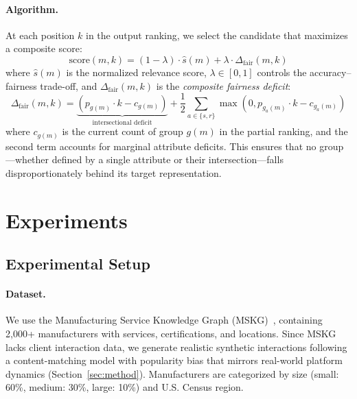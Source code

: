 \documentclass[sigconf,natbib=true]{acmart}
\begin{document}
\paragraph{Algorithm.} At each position $k$ in the output ranking, we select the candidate that maximizes a composite score:
\begin{equation}
    \text{score}(m, k) = (1 - \lambda) \cdot \hat{s}(m) + \lambda \cdot \Delta_{\text{fair}}(m, k)
    \label{eq:composite}
\end{equation}
where $\hat{s}(m)$ is the normalized relevance score, $\lambda \in [0, 1]$ controls the accuracy--fairness trade-off, and $\Delta_{\text{fair}}(m, k)$ is the \emph{composite fairness deficit}:
\begin{equation}
    \Delta_{\text{fair}}(m, k) = \underbrace{(p_{g(m)} \cdot k - c_{g(m)})}_{\text{intersectional deficit}} + \frac{1}{2} \sum_{a \in \{s,r\}} \max(0, p_{g_a(m)} \cdot k - c_{g_a(m)})
\end{equation}
where $c_{g(m)}$ is the current count of group $g(m)$ in the partial ranking, and the second term accounts for marginal attribute deficits. This ensures that no group---whether defined by a single attribute or their intersection---falls disproportionately behind its target representation.

\section{Experiments}
\label{sec:experiments}

\subsection{Experimental Setup}

\paragraph{Dataset.} We use the Manufacturing Service Knowledge Graph (MSKG)~\cite{li2024building}, containing 2,000+ manufacturers with services, certifications, and locations. Since MSKG lacks client interaction data, we generate realistic synthetic interactions following a content-matching model with popularity bias that mirrors real-world platform dynamics (Section~\ref{sec:method}). Manufacturers are categorized by size (small: 60\%, medium: 30\%, large: 10\%) and U.S. Census region.
\end{document}
